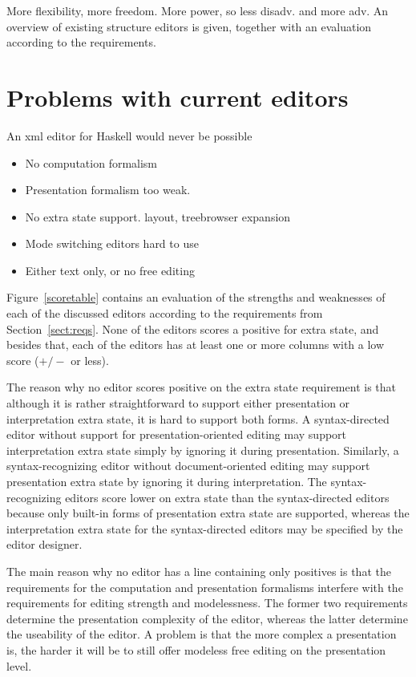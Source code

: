  
\bc
More flexibility, more freedom. More power, so less disadv. and more adv. An overview of existing structure editors is given, together with an evaluation according to the requirements. 

\section{Problems with current editors}
An xml editor for Haskell would never be possible
\begin{itemize}
\item No computation formalism
\item Presentation formalism too weak. 
\item No extra state support. layout, treebrowser expansion
\item Mode switching editors hard to use
\item Either text only, or no free editing
\end{itemize}
\ec

Figure~\ref{scoretable} contains an evaluation of the strengths and weaknesses of each of the discussed editors according to the requirements from Section~\ref{sect:reqs}. None of the editors scores a positive for extra state, and besides that, each of the editors has at least one or more columns with a low score ($+/-$ or less). 

The reason why no editor scores positive on the extra state requirement is that although it is rather straightforward to support either presentation or interpretation extra state, it is hard to support both forms. A syntax-directed editor without support for presentation-oriented editing may support interpretation extra state simply by ignoring it during presentation. Similarly, a syntax-recognizing editor without document-oriented editing may support presentation extra state by ignoring it during interpretation. The syntax-recognizing editors score lower on extra state than the syntax-directed editors because only built-in forms of presentation extra state are supported, whereas the interpretation extra state for the syntax-directed editors may be specified by the editor designer.

The main reason why no editor has a line containing only positives is that the requirements for the computation and presentation formalisms interfere with the requirements for editing strength and modelessness. The former two requirements determine the presentation complexity of the editor, whereas the latter determine the useability of the editor. A problem is that the more complex a presentation is, the harder it will be to still offer modeless free editing on the presentation level.

